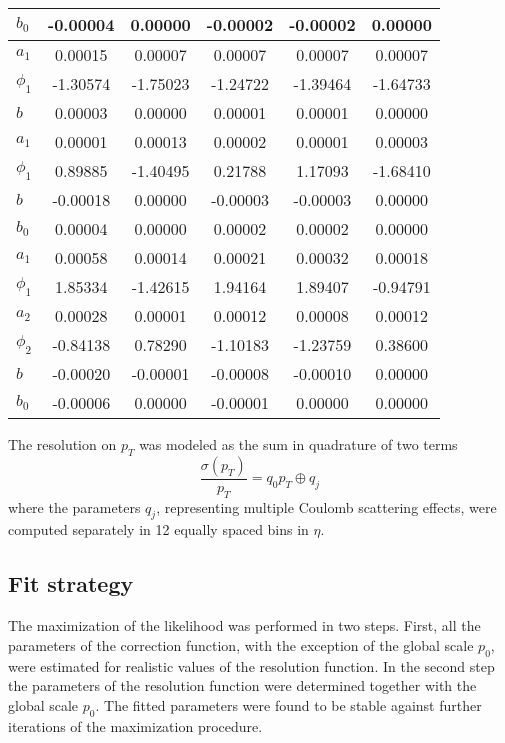 \begin{sidewaystable}[hbH]
\begin{center}
\begin{tabular}{|l|c|c|c|c|c|}
$b_0$ & -0.00004  & 0.00000  & -0.00002  & -0.00002  & 0.00000  \\
\hline
$a_1$ & 0.00015  & 0.00007  & 0.00007  & 0.00007  & 0.00007  \\
$\phi_1$ & -1.30574  & -1.75023  & -1.24722  & -1.39464  & -1.64733  \\
$b$ & 0.00003  & 0.00000  & 0.00001  & 0.00001  & 0.00000  \\
\hline
$a_1$ & 0.00001  & 0.00013  & 0.00002  & 0.00001  & 0.00003  \\
$\phi_1$ & 0.89885  & -1.40495  & 0.21788  & 1.17093  & -1.68410  \\
$b$ & -0.00018  & 0.00000  & -0.00003  & -0.00003  & 0.00000  \\
$b_0$ & 0.00004  & 0.00000  & 0.00002  & 0.00002  & 0.00000  \\
\hline
$a_1$ & 0.00058  & 0.00014  & 0.00021  & 0.00032  & 0.00018  \\
$\phi_1$ & 1.85334  & -1.42615  & 1.94164  & 1.89407  & -0.94791  \\
$a_2$ & 0.00028  & 0.00001  & 0.00012  & 0.00008  & 0.00012  \\
$\phi_2$ & -0.84138  & 0.78290  & -1.10183  & -1.23759  & 0.38600  \\
$b$ & -0.00020  & -0.00001  & -0.00008  & -0.00010  & 0.00000  \\
$b_0$ & -0.00006  & 0.00000  & -0.00001  & 0.00000  & 0.00000  \\
\hline
\hline
\end{tabular}
\end{center}
\end{sidewaystable}

The resolution on $p_T$ was modeled as the sum in quadrature of two terms
\begin{equation}
\frac{\sigma(p_T)}{p_T}=q_0 p_T \oplus q_j
\label{eq:resolution_function}
\end{equation}
where the parameters $q_j$, representing multiple Coulomb scattering
effects, were computed separately in 12 equally spaced bins in $\eta$. 
%
\subsection{Fit strategy}
% 
The maximization of the likelihood was performed in two steps. 
First, all the parameters of the correction
function, with the exception of the global scale $p_0$, were estimated 
for realistic values of the resolution function. In the second step
the parameters of the resolution function were determined together
with the global scale $p_0$. 
The fitted parameters were found to be stable against further
iterations of the maximization procedure.


